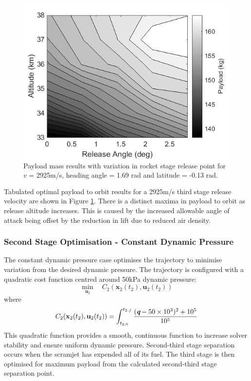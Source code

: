 \documentclass[]{aiaa-tc}
\begin{document}
	    \begin{figure}[H]
	    	\begin{center}
	    		\includegraphics[width=0.6\linewidth]{contours}
	    		\caption{Payload mass results with variation in rocket stage release point for $v$ = 2925m/s, heading angle = 1.69 rad and latitude = -0.13 rad.}
	    		\label{fig:contours}
	    	\end{center}
	    \end{figure}
	    
	    Tabulated optimal payload to orbit results for a 2925m/s third stage release velocity are shown in Figure \ref{fig:contours}. There is a distinct maxima in payload to orbit as release altitude increases. This is caused by the increased allowable angle of attack being offset by the reduction in lift due to reduced air density.
	    
	 
	 
	 	 \subsubsection{Second Stage Optimisation - Constant Dynamic Pressure}
	 	 
	 	 
	 	 The constant dynamic pressure case optimises the trajectory to minimise variation from the desired dynamic pressure.
	 	 The trajectory is configured with a quadratic cost function centred around 50kPa dynamic pressure:
	 	 \begin{equation} 
	 	 \min\limits_{\textbf{u}_2} \quad C_2(\textbf{x}_{2}(t_2),\textbf{u}_{2}(t_2))
	 	 \end{equation}
	 	 where
	 	 \begin{equation}
	 	 C_2(\textbf{x}_{2}(t_2),\textbf{u}_{2}(t_2)) = \int_{t_{2,0}}^{t_{2,f}} \frac{(\textit{\textbf{q}}-50\times 10^3)^2+10^5}{10^5} 
	 	 \end{equation}
	This quadratic function provides a smooth, continuous function to increase solver stability and ensure uniform dynamic pressure. Second-third stage separation occurs when the scramjet has expended all of its fuel.  The third stage is then optimised for maximum payload from the calculated second-third stage separation point. 
	 	 
\end{document}
